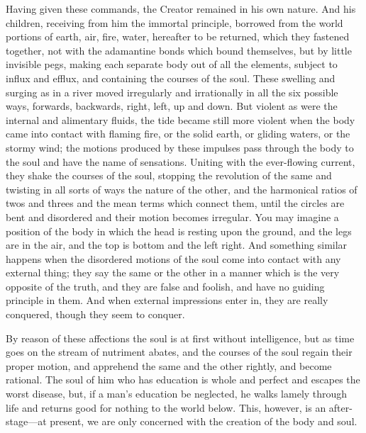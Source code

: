 Having given these commands, the Creator remained in his own nature. And
his children, receiving from him the immortal principle, borrowed from the
world portions of earth, air, fire, water, hereafter to be returned, which
they fastened together, not with the adamantine bonds which bound
themselves, but by little invisible pegs, making each separate body out of
all the elements, subject to influx and efflux, and containing the courses
of the soul. These swelling and surging as in a river moved irregularly
and irrationally in all the six possible ways, forwards, backwards, right,
left, up and down. But violent as were the internal and alimentary fluids,
the tide became still more violent when the body came into contact with
flaming fire, or the solid earth, or gliding waters, or the stormy wind;
the motions produced by these impulses pass through the body to the soul
and have the name of sensations. Uniting with the ever-flowing current,
they shake the courses of the soul, stopping the revolution of the same
and twisting in all sorts of ways the nature of the other, and the
harmonical ratios of twos and threes and the mean terms which connect
them, until the circles are bent and disordered and their motion becomes
irregular. You may imagine a position of the body in which the head is
resting upon the ground, and the legs are in the air, and the top is
bottom and the left right. And something similar happens when the
disordered motions of the soul come into contact with any external thing;
they say the same or the other in a manner which is the very opposite of
the truth, and they are false and foolish, and have no guiding principle
in them. And when external impressions enter in, they are really
conquered, though they seem to conquer.

By reason of these affections the soul is at first without intelligence,
but as time goes on the stream of nutriment abates, and the courses of the
soul regain their proper motion, and apprehend the same and the other
rightly, and become rational. The soul of him who has education is whole
and perfect and escapes the worst disease, but, if a man’s education be
neglected, he walks lamely through life and returns good for nothing to
the world below. This, however, is an after-stage—at present, we are
only concerned with the creation of the body and soul.

